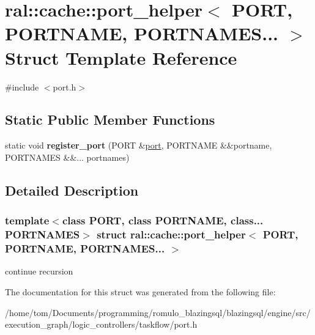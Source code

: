 \hypertarget{structral_1_1cache_1_1port__helper_3_01PORT_00_01PORTNAME_00_01PORTNAMES_8_8_8_01_4}{}\section{ral\+:\+:cache\+:\+:port\+\_\+helper$<$ P\+O\+RT, P\+O\+R\+T\+N\+A\+ME, P\+O\+R\+T\+N\+A\+M\+ES... $>$ Struct Template Reference}
\label{structral_1_1cache_1_1port__helper_3_01PORT_00_01PORTNAME_00_01PORTNAMES_8_8_8_01_4}


{\ttfamily \#include $<$port.\+h$>$}

\subsection*{Static Public Member Functions}
\begin{DoxyCompactItemize}
\item 
\mbox{\label{structral_1_1cache_1_1port__helper_3_01PORT_00_01PORTNAME_00_01PORTNAMES_8_8_8_01_4_afa9e073b9dee8f116cf3fd62bb88a067}} 
static void {\bfseries register\+\_\+port} (P\+O\+RT \&\hyperlink{classral_1_1cache_1_1port}{port}, P\+O\+R\+T\+N\+A\+ME \&\&portname, P\+O\+R\+T\+N\+A\+M\+ES \&\&... portnames)
\end{DoxyCompactItemize}


\subsection{Detailed Description}
\subsubsection*{template$<$class P\+O\+RT, class P\+O\+R\+T\+N\+A\+ME, class... P\+O\+R\+T\+N\+A\+M\+ES$>$\newline
struct ral\+::cache\+::port\+\_\+helper$<$ P\+O\+R\+T, P\+O\+R\+T\+N\+A\+M\+E, P\+O\+R\+T\+N\+A\+M\+E\+S... $>$}

continue recursion 

The documentation for this struct was generated from the following file\+:\begin{DoxyCompactItemize}
\item 
/home/tom/\+Documents/programming/romulo\+\_\+blazingsql/blazingsql/engine/src/execution\+\_\+graph/logic\+\_\+controllers/taskflow/port.\+h\end{DoxyCompactItemize}
